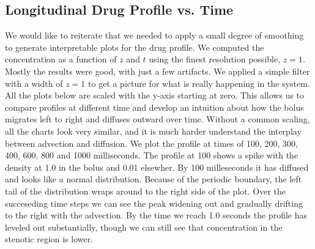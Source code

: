 \documentclass[11pt]{article} %
\begin{document}
\subsection{Longitudinal Drug Profile vs. Time}
We would like to reiterate that we needed to apply a small degree of smoothing
to generate interpretable plots for the drug profile.  
We computed the concentration as a function of $z$ and $t$ using the finest resolution
possible, $z=1$.  Mostly the results were good, with just a few artifacts.
We applied a simple filter with a width of $z=1$ to get a picture for what is really happening
in the system.  
All the plots below are scaled with the y-axis starting at zero.  
This allows us to compare profiles at different time and develop an intuition
about how the bolus migrates left to right and diffuses outward over time.
Without a common scaling, all the charts look very similar, and it is
much harder understand the interplay between advection and diffusion.
We plot the profile at times of 100, 200, 300, 400, 600, 800 and 1000 milliseconds.
The profile at 100 shows a spike with the density at 1.0 in the bolus and 0.01 elsewher.
By 100 milleseconds it has diffused and looks like a normal distribution.
Because of the periodic boundary, the left tail of the distribution wraps around
to the right side of the plot.  
Over the succeseding time steps we can see the peak widening out and
gradually drifting to the right with the advection.
By the time we reach 1.0 seconds the profile has leveled out substantially,
though we can still see that concentration in the stenotic region is lower.
\end{document}
